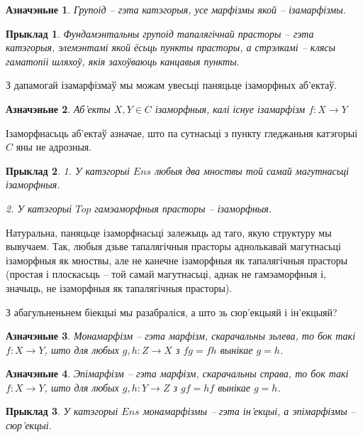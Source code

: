 \documentclass[a4paper,12pt]{book}
\newtheorem{example}{Прыклад}[section]
\newtheorem{definition}{Азначэньне}[section]
\begin{document}
\begin{definition}
  Групоід -- гэта катэгорыя, усе марфізмы якой -- ізамарфізмы.
\end{definition}

\begin{example}
  Фундамэнтальны групоід тапалягічнай прасторы -- гэта катэгорыя,
  элемэнтамі якой ёсьць пункты прасторы, а стрэлкамі -- клясы
  гаматопіі шляхоў, якія захоўваюць канцавыя пункты.
\end{example}

З дапамогай ізамарфізмаў мы можам увесьці паняцьце ізаморфных
аб'ектаў.

\begin{definition}
  Аб'екты $X, Y \in C$ ізаморфныя, калі існуе ізамарфізм $f: X
  \rightarrow Y$
\end{definition}

Ізаморфнасьць аб'ектаў азначае, што па сутнасьці з пункту гледжаньня
катэгорыі $C$ яны не адрозныя.

\begin{example}
  1. У катэгорыі $Ens$ любыя два мноствы той самай магутнасьці
  ізаморфныя.

  2. У катэгорыі $Top$ гамэаморфныя прасторы -- ізаморфныя.
\end{example}

Натуральна, паняцьце ізаморфнасьці залежыць ад таго, якую структуру мы
вывучаем. Так, любыя дзьве тапалягічныя прасторы аднолькавай
магутнасьці ізаморфныя як мноствы, але не канечне ізаморфныя як
тапалягічныя прасторы (простая і плоскасьць -- той самай магутнасьці,
аднак не гамэаморфныя і, значыць, не ізаморфныя як тапалягічныя прасторы).

З абагульненьнем біекцыі мы разабраліся, а што зь сюр'екцыяй і
ін'екцыяй?

\begin{definition}
  Монамарфізм -- гэта марфізм, скарачальны зьлева, то бок такі $f: X
  \rightarrow Y$, што для любых $g, h: Z \rightarrow X$ з $fg = fh$
  вынікае $g = h$.
\end{definition}

\begin{definition}
  Эпімарфізм -- гэта марфізм, скарачальны справа, то бок такі $f: X
  \rightarrow Y$, што для любых $g, h: Y \rightarrow Z$ з $gf = hf$
  вынікае $g = h$.
\end{definition}

\begin{example}
  У катэгорыі $Ens$ монамарфізмы -- гэта ін'екцыі, а эпімарфізмы --
  сюр'екцыі.
\end{example}
\end{document}

